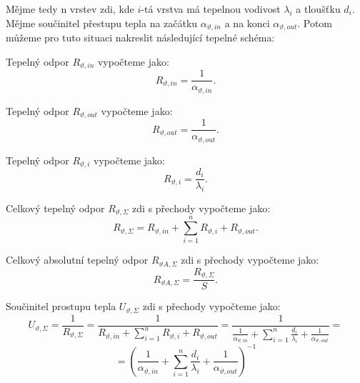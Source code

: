 \documentclass{article}
\begin{document}
Mějme tedy n vrstev zdi, kde $i$-tá vrstva má tepelnou vodivost $\lambda_i$ a tloušťku $d_i$. Mějme součinitel přestupu tepla na začátku $\alpha_{\vartheta,in}$ a na konci $\alpha_{\vartheta,out}$. Potom můžeme pro tuto situaci nakreslit následující tepelné schéma:
\begin{center}
\end{center}

Tepelný odpor $R_{\vartheta,in}$ vypočteme jako:
$$
    R_{\vartheta,in} = \frac{1}{\alpha_{\vartheta,in}}.
$$

Tepelný odpor $R_{\vartheta,out}$ vypočteme jako:
$$
    R_{\vartheta,out} = \frac{1}{\alpha_{\vartheta,out}}.
$$

Tepelný odpor $R_{\vartheta,i}$ vypočteme jako:
$$
    R_{\vartheta,i} = \frac{d_i}{\lambda_i}.
$$

Celkový tepelný odpor $R_{\vartheta,\Sigma}$ zdi s přechody vypočteme jako:
$$
    R_{\vartheta,\Sigma} = R_{\vartheta,in} + \sum_{i=1}^{n} R_{\vartheta,i} + R_{\vartheta,out}.
$$

Celkový absolutní tepelný odpor $R_{\vartheta A,\Sigma}$ zdi s přechody vypočteme jako:
$$
    R_{\vartheta A,\Sigma} = \frac{R_{\vartheta,\Sigma}}{S}.
$$

Součinitel prostupu tepla $U_{\vartheta,\Sigma}$ zdi s přechody vypočteme jako:
$$
    U_{\vartheta,\Sigma} = \frac{1}{R_{\vartheta,\Sigma}} = \frac{1}{R_{\vartheta,in} + \sum_{i=1}^{n} R_{\vartheta,i} + R_{\vartheta,out}} = \frac{1}{\frac{1}{\alpha_{\vartheta,in}} + \sum_{i=1}^{n} \frac{d_i}{\lambda_i} + \frac{1}{\alpha_{\vartheta,out}}} =
$$
$$
    = \left ( \frac{1}{\alpha_{\vartheta,in}} + \sum_{i=1}^{n} \frac{d_i}{\lambda_i} + \frac{1}{\alpha_{\vartheta,out}} \right )^{-1}
$$
\end{document}
